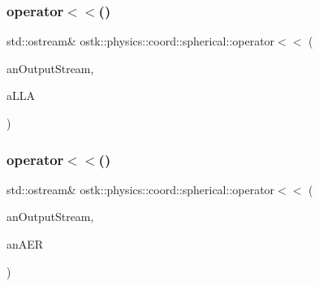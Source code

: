 \subsubsection{\texorpdfstring{operator$<$$<$()}{operator<<()}\hspace{0.1cm}{\footnotesize\ttfamily [1/2]}}
{\footnotesize\ttfamily std\+::ostream\& ostk\+::physics\+::coord\+::spherical\+::operator$<$$<$ (\begin{DoxyParamCaption}\item[{std\+::ostream \&}]{an\+Output\+Stream,  }\item[{const \hyperlink{classostk_1_1physics_1_1coord_1_1spherical_1_1_l_l_a}{L\+LA} \&}]{a\+L\+LA }\end{DoxyParamCaption})}

\mbox{\label{namespaceostk_1_1physics_1_1coord_1_1spherical_af33c974b46dff47bb03a4ed4bfcd6778}} 
\subsubsection{\texorpdfstring{operator$<$$<$()}{operator<<()}\hspace{0.1cm}{\footnotesize\ttfamily [2/2]}}
{\footnotesize\ttfamily std\+::ostream\& ostk\+::physics\+::coord\+::spherical\+::operator$<$$<$ (\begin{DoxyParamCaption}\item[{std\+::ostream \&}]{an\+Output\+Stream,  }\item[{const \hyperlink{classostk_1_1physics_1_1coord_1_1spherical_1_1_a_e_r}{A\+ER} \&}]{an\+A\+ER }\end{DoxyParamCaption})}

